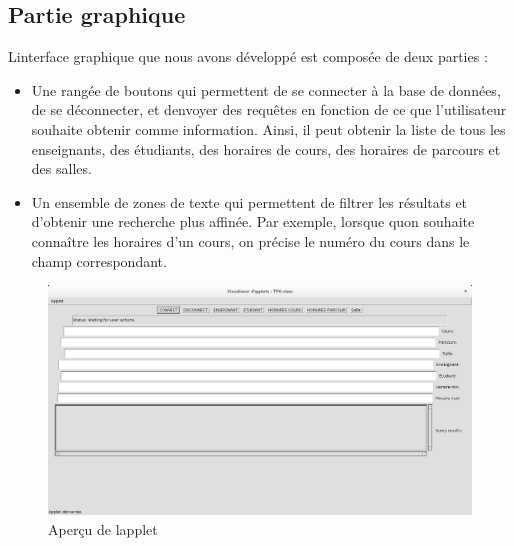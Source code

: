\documentclass{article}
\begin{document}
\subsection{Partie graphique}
L\textquotesingle interface graphique que nous avons d\'evelopp\'e est compos\'ee de deux parties :
\begin{itemize}
\item Une rang\'ee de boutons qui permettent de se connecter \`a la base de donn\'ees, de se d\'econnecter, et d\textquotesingle envoyer des requ\^etes en fonction de ce que l'utilisateur souhaite obtenir comme information. Ainsi, il peut obtenir la liste de tous les enseignants, des \'etudiants, des horaires de cours, des horaires de parcours et des salles. 
\item Un ensemble de zones de texte qui permettent de filtrer les r\'esultats et d'obtenir une recherche plus affin\'ee. Par exemple, lorsque qu\textquotesingle on souhaite conna\^itre les horaires d'un cours, on pr\'ecise le num\'ero du cours dans le champ correspondant.\\
\end{itemize} 
\begin{figure}[!h]
\includegraphics[scale=0.33]{applet.png}
\caption{Aper\c{c}u de l\textquotesingle applet}
\end{figure}
\end{document}
